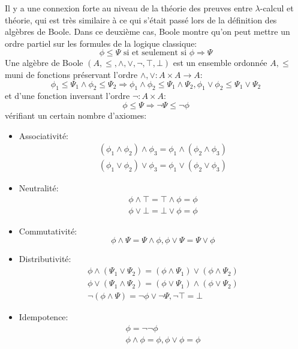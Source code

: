 \documentclass[math]{cours}
\begin{document}
Il y a une connexion forte au niveau de la théorie des preuves entre $\lambda$-calcul et théorie, qui est très similaire à ce qui s'était passé lors de la définition des algèbres de Boole.
Dans ce deuxième cas, Boole montre qu'on peut mettre un ordre partiel sur les formules de la logique classique:
\begin{equation*}
	\phi \leq \Psi \text{ si et seulement si } \phi \Rightarrow \Psi
\end{equation*}
Une algèbre de Boole $(A, \leq, \land, \lor, \lnot, \top, \bot)$ est un ensemble ordonnée $A, \leq$ muni de fonctions préservant l'ordre $\land, \lor: A\times A \to A$:
\begin{equation*}
	\phi_{1} \leq \Psi_{1} \land \phi_{2} \leq \Psi_{2} \Longrightarrow \phi_{1} \land \phi_{2} \leq \Psi_{1}\land \Psi_{2}, \phi_{1} \lor \phi_{2} \leq \Psi_{1}\lor \Psi_{2}
\end{equation*}
et d'une fonction inversant l'ordre $\lnot: A \times A$:
\begin{equation*}
	\phi \leq \Psi \Rightarrow \lnot \Psi \leq \lnot \phi
\end{equation*}
vérifiant un certain nombre d'axiomes:
\begin{multicols}{2}
	\begin{itemize}
		\item Associativité:
				\begin{align*}
					\left(\phi_{1}\land\phi_{2}\right) \land \phi_{3} = \phi_{1}\land\left(\phi_{2}\land \phi_{3}\right)\\
					\left(\phi_{1}\lor\phi_{2}\right) \lor \phi_{3} = \phi_{1}\lor\left(\phi_{2}\lor \phi_{3}\right)
				\end{align*}
		\item Neutralité:
				\begin{align*}
					\phi \land \top = \top \land \phi = \phi\\
					\phi \lor \bot = \bot \lor \phi = \phi
				\end{align*}
		\item Commutativité:
			\begin{equation*}
				\phi \land \Psi = \Psi \land \phi, \phi \lor \Psi = \Psi \lor \phi
			\end{equation*}
		\item Distributivité:
			\begin{align*}
				\phi \land \left(\Psi_{1} \lor \Psi_{2}\right) = \left(\phi \land \Psi_{1}\right) \lor \left(\phi \land \Psi_{2}\right)\\
				\phi \lor \left(\Psi_{1} \land \Psi_{2}\right) = \left(\phi \lor \Psi_{1}\right) \land \left(\phi \lor \Psi_{2}\right)\\
				\lnot\left(\phi \land \Psi\right) = \lnot\phi \lor \lnot \Psi, \lnot\top = \bot
			\end{align*}
		\item Idempotence:
			\begin{align*}
				\phi = \lnot\lnot \phi\\
				\phi \land \phi = \phi, \phi \lor \phi = \phi
			\end{align*}
	\end{itemize}
\end{multicols}
\end{document}
